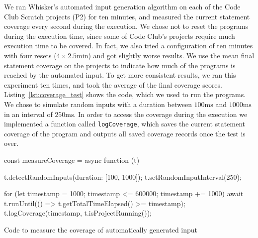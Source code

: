 We ran Whisker's automated input generation algorithm on each of the Code Club Scratch projects (P2) for ten minutes,
and measured the current statement coverage every second during the execution.
We chose not to reset the programs during the execution time,
since some of Code Club's projects require much execution time to be covered.
In fact, we also tried a configuration of ten minutes with four resets ($4 \times 2.5\text{min}$)
and got slightly worse results.
We use the mean final statement coverage on the projects to indicate how much of the programs is reached by the automated input.
To get more consistent results, we ran this experiment ten times, and took the average of the final coverage scores.
Listing~\ref{lst:coverage_test} shows the code, which we used to run the programs.
We chose to simulate random inputs with a duration between $100\text{ms}$ and $1000\text{ms}$ in an interval of $250\text{ms}$.
In order to access the coverage during the execution we implemented a function called \texttt{logCoverage},
which saves the current statement coverage of the program and outputs all saved coverage records once the test is over.
\parspace


\begin{listing}[ht]
    \centering

    \begin{minipage}{.9\textwidth}
        \begin{javascriptcode}
            const measureCoverage = async function (t) {
                t.detectRandomInputs({duration: [100, 1000]});
                t.setRandomInputInterval(250);

                for (let timestamp = 1000; timestamp <= 600000; timestamp += 1000) {
                    await t.runUntil(() => t.getTotalTimeElapsed() >= timestamp);
                    t.logCoverage(timestamp, t.isProjectRunning());
                }
            }
        \end{javascriptcode}
    \end{minipage}

    \caption{Code to measure the coverage of automatically generated input}
    \label{lst:coverage_test}
\end{listing}

